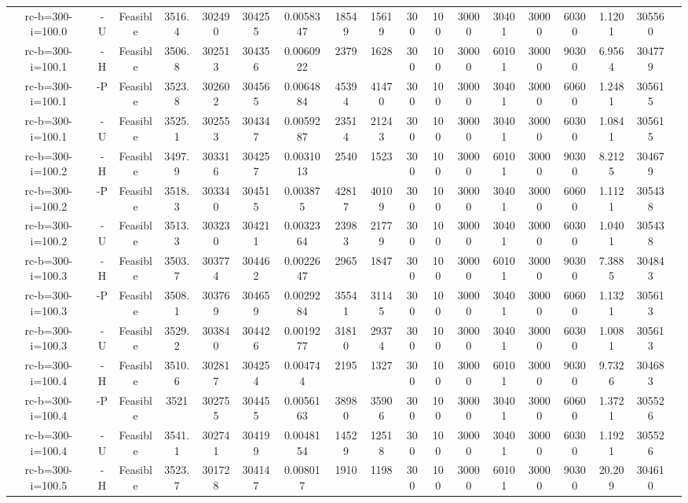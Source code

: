 \documentclass[landscape, a4paper]{article}
\begin{document}
\begin{center}
\begin{tabular}{@{}cccccccccccccccccc@{}}
rc-b=300-i=100.0 & -U & Feasible & 3516.4 & 302490 & 304255 & 0.0058347 & 18549 & 15619 & 300 & 100 & 30000 & 30401 & 30000 & 60300 & 1.1201 & 305560 & \\
rc-b=300-i=100.1 & -H & Feasible & 3506.8 & 302513 & 304356 & 0.0060922 & 2379 & 1628 & 300 & 100 & 30000 & 60101 & 30000 & 90300 & 6.9564 & 304779 & \\
rc-b=300-i=100.1 & -P & Feasible & 3523.8 & 302602 & 304565 & 0.0064884 & 45394 & 41470 & 300 & 100 & 30000 & 30401 & 30000 & 60600 & 1.2481 & 305615 & \\
rc-b=300-i=100.1 & -U & Feasible & 3525.1 & 302553 & 304347 & 0.0059287 & 23514 & 21243 & 300 & 100 & 30000 & 30401 & 30000 & 60300 & 1.0841 & 305615 & \\
rc-b=300-i=100.2 & -H & Feasible & 3497.9 & 303316 & 304257 & 0.0031013 & 2540 & 1523 & 300 & 100 & 30000 & 60101 & 30000 & 90300 & 8.2125 & 304679 & \\
rc-b=300-i=100.2 & -P & Feasible & 3518.3 & 303340 & 304515 & 0.003875 & 42817 & 40109 & 300 & 100 & 30000 & 30401 & 30000 & 60600 & 1.1121 & 305438 & \\
rc-b=300-i=100.2 & -U & Feasible & 3513.3 & 303230 & 304211 & 0.0032364 & 23983 & 21779 & 300 & 100 & 30000 & 30401 & 30000 & 60300 & 1.0401 & 305438 & \\
rc-b=300-i=100.3 & -H & Feasible & 3503.7 & 303774 & 304462 & 0.0022647 & 2965 & 1847 & 300 & 100 & 30000 & 60101 & 30000 & 90300 & 7.3885 & 304843 & \\
rc-b=300-i=100.3 & -P & Feasible & 3508.1 & 303769 & 304659 & 0.0029284 & 35541 & 31145 & 300 & 100 & 30000 & 30401 & 30000 & 60600 & 1.1321 & 305613 & \\
rc-b=300-i=100.3 & -U & Feasible & 3529.2 & 303840 & 304426 & 0.0019277 & 31810 & 29374 & 300 & 100 & 30000 & 30401 & 30000 & 60300 & 1.0081 & 305613 & \\
rc-b=300-i=100.4 & -H & Feasible & 3510.6 & 302817 & 304254 & 0.004744 & 2195 & 1327 & 300 & 100 & 30000 & 60101 & 30000 & 90300 & 9.7326 & 304683 & \\
rc-b=300-i=100.4 & -P & Feasible & 3521 & 302755 & 304455 & 0.0056163 & 38980 & 35906 & 300 & 100 & 30000 & 30401 & 30000 & 60600 & 1.3721 & 305526 & \\
rc-b=300-i=100.4 & -U & Feasible & 3541.1 & 302741 & 304199 & 0.0048154 & 14529 & 12518 & 300 & 100 & 30000 & 30401 & 30000 & 60300 & 1.1921 & 305526 & \\
rc-b=300-i=100.5 & -H & Feasible & 3523.7 & 301728 & 304147 & 0.008017 & 1910 & 1198 & 300 & 100 & 30000 & 60101 & 30000 & 90300 & 20.209 & 304610 & \\

\end{tabular}
\end{center}
\end{document}

